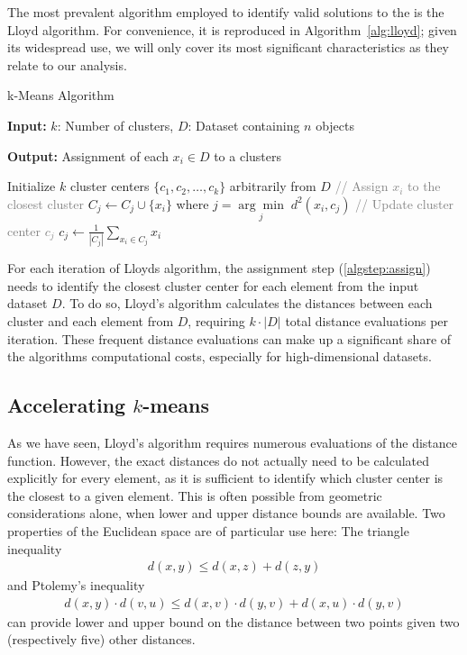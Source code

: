 The most prevalent algorithm employed to identify valid solutions to the \kmeans is the Lloyd algorithm.
For convenience, it is reproduced in Algorithm~\ref{alg:lloyd};
given its widespread use, we will only cover its most significant characteristics as they relate to our analysis.

\begin{algorithm}[t]
	\caption{k-Means Algorithm}
	\label{alg:lloyd}

	\textbf{Input:} \( k \): Number of clusters, \( D \): Dataset containing \( n \) objects

	\textbf{Output:} Assignment of each $x_i \in D$ to a clusters

	\begin{algorithmic}[1]
		\State Initialize \( k \) cluster centers \( \{c_1, c_2, \dots, c_k\} \) arbitrarily from \( D \)
		\Repeat
		\State \textcolor{gray}{// Assign \( x_i \) to the closest cluster}
		\label{algstep:assign}
		\State \( C_j \leftarrow C_j \cup \{x_i\} \) where \( j = \underset{j}{\arg\min} \; d^2(x_i, c_j) \)
		\EndFor
		\State \textcolor{gray}{// Update cluster center \( c_j \)}
		\State \( c_j \leftarrow \frac{1}{|C_j|} \sum_{x_i \in C_j} x_i \)
		\EndFor
	\end{algorithmic}
\end{algorithm}

For each iteration of Lloyds algorithm, the assignment step (\autoref{algstep:assign}) needs to identify the closest cluster center for each element from the input dataset $D$.
To do so, Lloyd's algorithm calculates the distances between each cluster and each element from $D$, requiring $k\cdot|D|$ total distance evaluations per iteration.
These frequent distance evaluations can make up a significant share of the algorithms computational costs, especially for high-dimensional datasets.


\subsection{Accelerating $k$-means}
\label{sub:acc}



As we have seen, Lloyd's algorithm requires numerous evaluations of the distance function.
However, the exact distances do not actually need to be calculated explicitly for every element, as it is sufficient to identify which cluster center is the closest to a given element.
This is often possible from geometric considerations alone, when lower and upper distance bounds are available.
Two properties of the Euclidean space are of particular use here:
The triangle inequality
\begin{align}
	\label{eq:tri}
	d(x,y) \leq d(x,z) + d(z,y)
\end{align}
and Ptolemy's inequality
\begin{align}
	\label{eq:pto}
	d(x, y)\cdot d(v, u) \leq d(x, v) \cdot d(y,v) + d(x, u) \cdot d(y, v)
\end{align}
can provide lower and upper bound on the distance between two points given two (respectively five) other distances.

